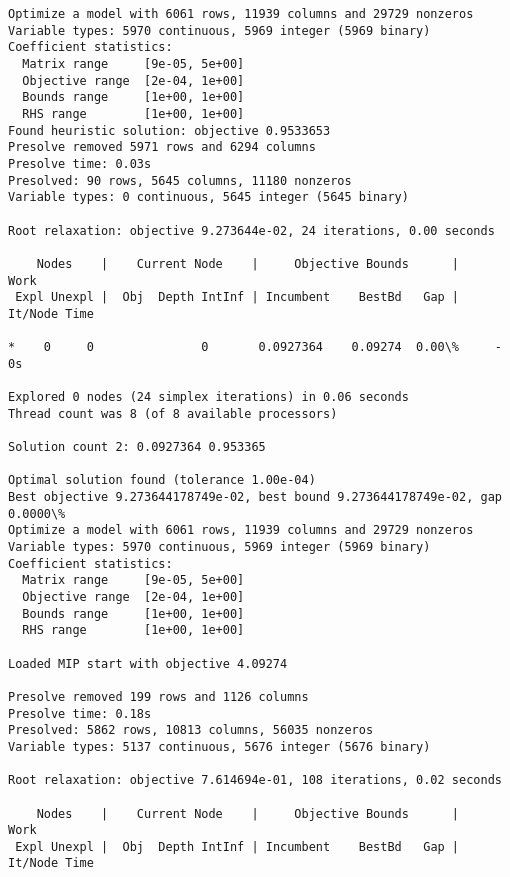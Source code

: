 \documentclass[11pt]{article}
\begin{document}
    \begin{Verbatim}[commandchars=\\\{\}]
Optimize a model with 6061 rows, 11939 columns and 29729 nonzeros
Variable types: 5970 continuous, 5969 integer (5969 binary)
Coefficient statistics:
  Matrix range     [9e-05, 5e+00]
  Objective range  [2e-04, 1e+00]
  Bounds range     [1e+00, 1e+00]
  RHS range        [1e+00, 1e+00]
Found heuristic solution: objective 0.9533653
Presolve removed 5971 rows and 6294 columns
Presolve time: 0.03s
Presolved: 90 rows, 5645 columns, 11180 nonzeros
Variable types: 0 continuous, 5645 integer (5645 binary)

Root relaxation: objective 9.273644e-02, 24 iterations, 0.00 seconds

    Nodes    |    Current Node    |     Objective Bounds      |     Work
 Expl Unexpl |  Obj  Depth IntInf | Incumbent    BestBd   Gap | It/Node Time

*    0     0               0       0.0927364    0.09274  0.00\%     -    0s

Explored 0 nodes (24 simplex iterations) in 0.06 seconds
Thread count was 8 (of 8 available processors)

Solution count 2: 0.0927364 0.953365 

Optimal solution found (tolerance 1.00e-04)
Best objective 9.273644178749e-02, best bound 9.273644178749e-02, gap 0.0000\%
Optimize a model with 6061 rows, 11939 columns and 29729 nonzeros
Variable types: 5970 continuous, 5969 integer (5969 binary)
Coefficient statistics:
  Matrix range     [9e-05, 5e+00]
  Objective range  [2e-04, 1e+00]
  Bounds range     [1e+00, 1e+00]
  RHS range        [1e+00, 1e+00]

Loaded MIP start with objective 4.09274

Presolve removed 199 rows and 1126 columns
Presolve time: 0.18s
Presolved: 5862 rows, 10813 columns, 56035 nonzeros
Variable types: 5137 continuous, 5676 integer (5676 binary)

Root relaxation: objective 7.614694e-01, 108 iterations, 0.02 seconds

    Nodes    |    Current Node    |     Objective Bounds      |     Work
 Expl Unexpl |  Obj  Depth IntInf | Incumbent    BestBd   Gap | It/Node Time


\end{Verbatim}
\end{document}
